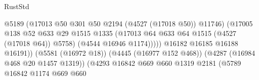 \begin{lexlean}{RustStd}
\begin{coremodule}
{\begin{coremodule}
{{{{{{{{{{{{{{{{{{{{{{{{{{{{{{{{{{{{{{                                                          @5189
                                                          (@17013
                                                            @50
                                                            @301
                                                            @50
                                                            @2194
                                                            (@4527 (@17018 @50))
                                                            @11746)
                                                          (@17005
                                                            @138
                                                            @52
                                                            @633
                                                            @29
                                                            @1515
                                                            @1335
                                                            (@17013
                                                              @64
                                                              @633
                                                              @64
                                                              @1515
                                                              (@4527 (@17018 @64))
                                                              @5758)
                                                            (@4544 @16946 @1174)))))
                                                    @16182
                                                    @16185
                                                    @16188
                                                    @16191))
                                                (@5581 (@16972 @18))
                                                (@4445 (@16977 @152 @468))
                                                (@4287 (@16984 @468 @20 @1457 @1319))
                                                (@4293
                                                  @16842
                                                  @669
                                                  @660
                                                  @1319
                                                  @2181
                                                  (@5789
                                                    @16842
                                                    @1174
                                                    @669
                                                    @660
}}}}}}}}}}}}}}}}}}}}}}}}}}}}}}}}}}}}}}
\end{coremodule}}
\end{coremodule}
\end{lexlean}
